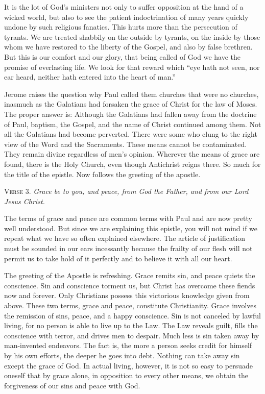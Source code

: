 It is the lot of God’s ministers not only to suffer opposition at the hand of a wicked world, but also to see the patient indoctrination of many years quickly undone by such religious fanatics. This hurts more than the persecution of tyrants. We are treated shabbily on the outside by tyrants, on the inside by those whom we have restored to the liberty of the Gospel, and also by false brethren. But this is our comfort and our glory, that being called of God we have the promise of everlasting life. We look for that reward which “eye hath not seen, nor ear heard, neither hath entered into the heart of man.”

Jerome raises the question why Paul called them churches that were no churches, inasmuch as the Galatians had forsaken the grace of Christ for the law of Moses. The proper answer is: Although the Galatians had fallen away from the doctrine of Paul, baptism, the Gospel, and the name of Christ continued among them. Not all the Galatians had become perverted. There were some who clung to the right view of the Word and the Sacraments. These means cannot be contaminated. They remain divine regardless of men’s opinion. Wherever the means of grace are found, there is the Holy Church, even though Antichrist reigns there. So much for the title of the epistle. Now follows the greeting of the apostle.

\textsc{Verse} 3. \emph{Grace be to you, and peace, from God the Father, and from our Lord Jesus Christ.}

The terms of grace and peace are common terms with Paul and are now pretty well understood. But since we are explaining this epistle, you will not mind if we repeat what we have so often explained elsewhere. The article of justification must be sounded in our ears incessantly because the frailty of our flesh will not permit us to take hold of it perfectly and to believe it with all our heart.

The greeting of the Apostle is refreshing. Grace remits sin, and peace quiets the conscience. Sin and conscience torment us, but Christ has overcome these fiends now and forever. Only Christians possess this victorious knowledge given from above. These two terms, grace and peace, constitute Christianity. Grace involves the remission of sins, peace, and a happy conscience. Sin is not canceled by lawful living, for no person is able to live up to the Law. The Law reveals guilt, fills the conscience with terror, and drives men to despair. Much less is sin taken away by man-invented endeavors. The fact is, the more a person seeks credit for himself by his own efforts, the deeper he goes into debt. Nothing can take away sin except the grace of God. In actual living, however, it is not so easy to persuade oneself that by grace alone, in opposition to every other means, we obtain the forgiveness of our sins and peace with God.

